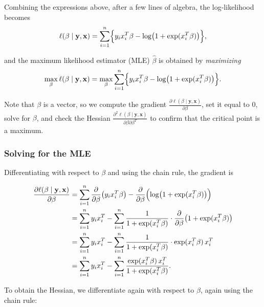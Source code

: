 \documentclass[
]{book}
\begin{document}
Combining the expressions above, after a few lines of algebra, the log-likelihood becomes
\[\ell (\beta \mid \mathbf{y}, \mathbf{x}) = \sum_{i=1}^{n}\Bigl\{ y_i x_i^T \beta - \log \bigl(1+ \exp(x_i^T \beta) \bigr)\Bigr\},\]

and the maximum likelihood estimator (MLE) \(\hat{\beta}\) is obtained by \emph{maximizing}
\[\max_{\beta} \ell (\beta \mid \mathbf{y}, \mathbf{x}) = \max_{\beta}  \sum_{i=1}^{n}\Bigl\{ y_i x_i^T \beta - \log \bigl(1+ \exp(x_i^T \beta) \bigr)\Bigr\}.\]

Note that \(\beta\) is a vector, so we compute the gradient
\(\frac{\partial \ell(\beta \mid \mathbf{y}, \mathbf{x})}{\partial \beta}\), set it equal to \(0\), solve for \(\beta\), and check the Hessian \(\frac{\partial^2 \ell(\beta \mid \mathbf{y}, \mathbf{x})}{\partial \beta \partial \beta^T}\)
to confirm that the critical point is a maximum.

\subsubsection*{Solving for the MLE}\label{solving-for-the-mle}

Differentiating with respect to \(\beta\) and using the chain rule, the gradient is

\begin{align*}
\frac{\partial \ell(\beta \mid \mathbf{y}, \mathbf{x})}{\partial \beta} &= 
\sum_{i=1}^{n} \frac{\partial }{\partial \beta} \bigl( y_i x_i^T \beta \bigr) - \frac{\partial }{\partial \beta} \Bigl(\log \bigl(1+ \exp(x_i^T \beta) \bigr) \Bigr)\\
&= \sum_{i=1}^{n} y_i x_i^T  - \sum_{i=1}^{n} \frac{1}{1+ \exp(x_i^T \beta) } \cdot  \frac{\partial }{\partial \beta} \bigl( 1+ \exp(x_i^T \beta) \bigr)\\
&=  \sum_{i=1}^{n} y_i x_i^T  - \sum_{i=1}^{n} \frac{1}{1+ \exp(x_i^T \beta) } \cdot   \exp(x_i^T \beta)\,  x_i^T\\
&=  \sum_{i=1}^{n} y_i x_i^T  - \sum_{i=1}^{n} \frac{\exp(x_i^T \beta)  \, x_i^T}{1+ \exp(x_i^T \beta) }.
\end{align*}

To obtain the Hessian, we differentiate again with respect to \(\beta\), again using the chain rule:
\end{document}
